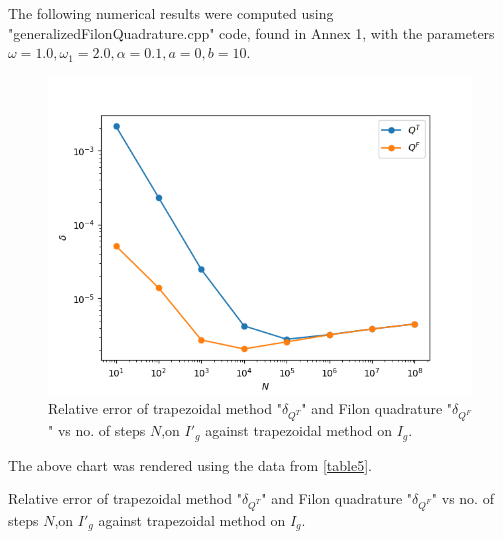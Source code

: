 The following numerical results were computed using "generalizedFilonQuadrature.cpp" code, found in Annex 1, with the parameters 
$\omega=1.0, \omega_1=2.0, \alpha=0.1, a=0, b=10$.

\begin{figure}[H]
  \centering
  \includegraphics[scale=0.8]{c4/results.png}
  \caption{Relative error of trapezoidal method "$\delta_{Q^T}$" and Filon quadrature "$\delta_{Q^F}$" vs no. of steps $N$,on $I'_g$ against trapezoidal method on $I_g$.}
  \label{figGraphGen}
\end{figure}

The above chart was rendered using the data from \ref{table5}.

\begin{table}[h!]
  \begin{center}
    \caption{Relative error of trapezoidal method "$\delta_{Q^T}$" and Filon quadrature "$\delta_{Q^F}$" vs no. of steps $N$,on $I'_g$ against trapezoidal method on $I_g$.}
    \label{table5}
  \end{center}
\end{table}


